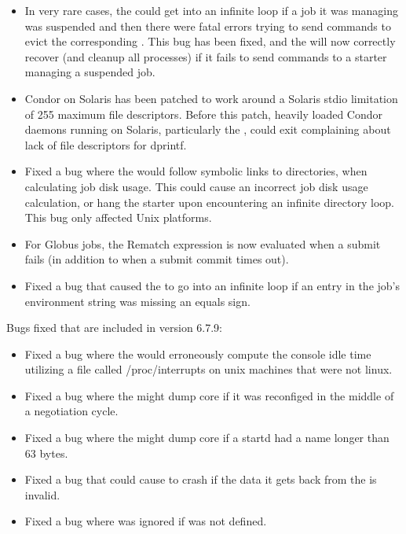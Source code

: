 \begin{itemize}

\item In very rare cases, the  could get into an
infinite loop if a job it was managing was suspended and then there
were fatal errors trying to send commands to evict the corresponding
.
This bug has been fixed, and the  will now correctly
recover (and cleanup all processes) if it fails to send commands to a
starter managing a suspended job.

\item Condor on Solaris has been patched to work around a Solaris stdio
limitation of 255 maximum file descriptors.  Before this patch, heavily
loaded Condor daemons running on Solaris, particularly the ,
could exit complaining about lack of file descriptors for dprintf.

\item Fixed a bug where the  would follow symbolic links to
directories, when calculating job disk usage.  This could cause an incorrect
job disk usage calculation, or hang the starter upon encountering an infinite
directory loop.  This bug only affected Unix platforms.

\item For Globus jobs, the Rematch expression is now evaluated when a
submit fails (in addition to when a submit commit times out).

\item Fixed a bug that caused the  to go into an
infinite loop if an entry in the job's environment string was missing
an equals sign.

\end{itemize}

\noindent Bugs fixed that are included in version 6.7.9:

\begin{itemize}

\item Fixed a bug where the  would erroneously compute the 
console idle time utilizing a file called /proc/interrupts on unix machines
that were not linux. 

\item Fixed a bug where the  might dump core if it was
reconfiged in the middle of a negotiation cycle.

\item Fixed a bug where the  might dump core if a startd
had a name longer than 63 bytes. 

\item Fixed a bug that could cause  to crash if the
data it gets back from the  is invalid.

\item Fixed a bug where
 was ignored if 
 was not defined.

\end{itemize}

